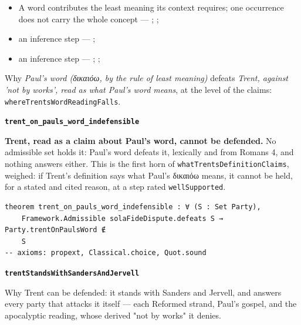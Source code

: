 \documentclass[11pt]{article}
\begin{document}
\begin{itemize}
\begin{itemize}
\item A word contributes the least meaning its context requires; one occurrence does not carry the whole concept --- \cite{silva-biblical-words-1994}; \cite{joos-semantic-axiom-1972}; \cite{barr-semantics-2004}
\item an inference step --- \cite[ad loc. Rom 4:6]{moo-romans-1996}; \cite[s.v. λογίζομαι]{bauer-danker-lexicon-2000}
\item an inference step --- \cite{silva-biblical-words-1994}; \cite[p. 80]{moo-romans-1996}; \cite{barr-semantics-2004}
\end{itemize}
\end{itemize}
\noindent Why \emph{Paul's word (δικαιόω, by the rule of least meaning)} defeats \emph{Trent, against 'not by works', read as what Paul's word means}, at the level of the claims: \texttt{where\allowbreak{}Trents\allowbreak{}Word\allowbreak{}Reading\allowbreak{}Falls}.
\par\medskip\noindent\textbf{\texttt{trent\_\allowbreak{}on\_\allowbreak{}pauls\_\allowbreak{}word\_\allowbreak{}indefensible}}\par\nobreak\noindent
\textbf{Trent, read as a claim about Paul's word, cannot be defended.} No admissible set holds it: Paul's word defeats it, lexically and from Romans 4, and nothing answers either. This is the first horn of \texttt{what\allowbreak{}Trents\allowbreak{}Definition\allowbreak{}Claims}, weighed: if Trent's definition says what Paul's δικαιόω means, it cannot be held, for a stated and cited reason, at a step rated \texttt{well\allowbreak{}Supported}.

{\small\begin{verbatim}
theorem trent_on_pauls_word_indefensible : ∀ (S : Set Party),
    Framework.Admissible solaFideDispute.defeats S → Party.trentOnPaulsWord ∉
    S
-- axioms: propext, Classical.choice, Quot.sound
\end{verbatim}}
\par\medskip\noindent\textbf{\texttt{trent\allowbreak{}Stands\allowbreak{}With\allowbreak{}Sanders\allowbreak{}And\allowbreak{}Jervell}}\par\nobreak\noindent
Why Trent can be defended: it stands with Sanders and Jervell, and answers every party that attacks it itself — each Reformed strand, Paul's gospel, and the apocalyptic reading, whose derived "not by works" it denies.
\end{document}
